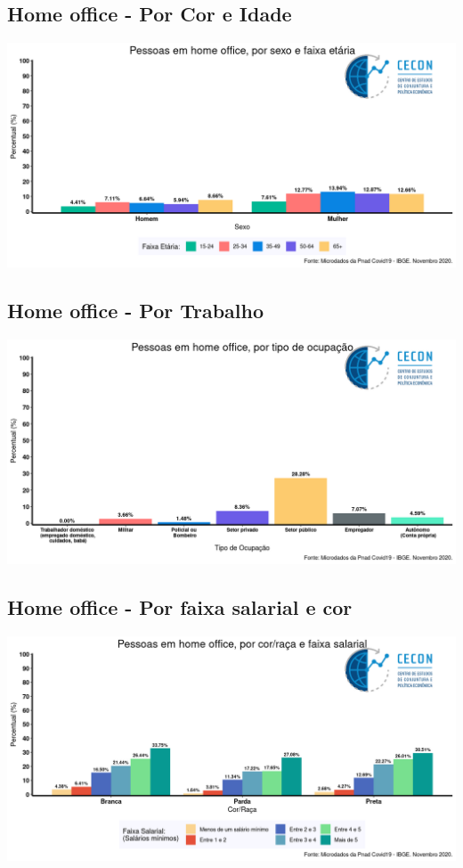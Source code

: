 \documentclass{SelfArx}
\begin{document}
\subsection*{Home office - Por Cor e Idade}
\label{sec:orgbeee3db}
\begin{center}
\includegraphics[width=.9\linewidth]{./figs/PNAD_COVID/home_sexo_idade.png}
\end{center}

\subsection*{Home office - Por Trabalho}
\label{sec:org88b3e0a}
\begin{center}
\includegraphics[width=.9\linewidth]{./figs/PNAD_COVID/home_emprego.png}
\end{center}

\subsection*{Home office - Por faixa salarial e cor}
\label{sec:orgb17fea0}
\begin{center}
\includegraphics[width=.9\linewidth]{./figs/PNAD_COVID/home_renda.png}
\end{center}
\end{document}
